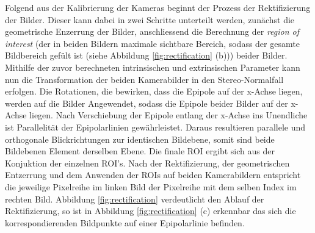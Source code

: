 \noindent
Folgend aus der Kalibrierung der Kameras beginnt der Prozess der Rektifizierung der Bilder. Dieser kann dabei in zwei Schritte unterteilt werden, zunächst die geometrische Enzerrung der Bilder, anschliessend die Berechnung der \emph{region of interest} (der in beiden Bildern maximale sichtbare Bereich, sodass der gesamte Bildbereich gefült ist (siehe Abbildung \ref{fig:rectification} (b))) beider Bilder. Mithilfe der zuvor berechneten intrinsischen und extrinsischen Parameter kann nun die Transformation der beiden Kamerabilder in den Stereo-Normalfall erfolgen. Die Rotationen, die bewirken, dass die Epipole auf der x-Achse liegen, werden auf die Bilder Angewendet, sodass die Epipole beider Bilder auf der x-Achse liegen. Nach Verschiebung der Epipole entlang der x-Achse ins Unendliche ist Parallelität der Epipolarlinien gewährleistet. Daraus resultieren parallele und orthogonale Blickrichtungen zur identischen Bildebene, somit sind beide Bildebenen Element derselben Ebene. Die finale ROI ergibt sich aus der Konjuktion der einzelnen ROI's. Nach der Rektifizierung, der geometrischen Entzerrung und dem Anwenden der ROIs auf beiden Kamerabildern entspricht die jeweilige Pixelreihe im linken Bild der Pixelreihe mit dem selben Index im rechten Bild. Abbildung \ref{fig:rectification} verdeutlicht den Ablauf der Rektifizierung, so ist in Abbildung \ref{fig:rectification} (c) erkennbar das sich die korrespondierenden Bildpunkte auf einer Epipolarlinie befinden.\\

